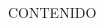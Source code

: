 \begin{frame}
\end{frame}
\begin{frame}
\begin{center}
  \titlepage %
\end{center}
\end{frame}
\begin{frame}{CONTENIDO}
\begin{multicols}{2}
  \tableofcontents
\end{multicols}
\end{frame}